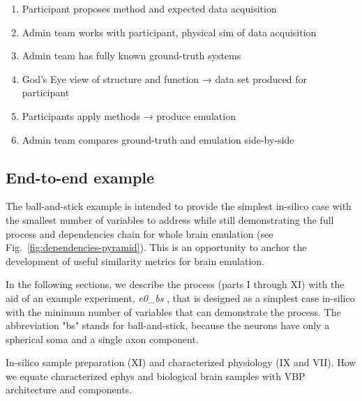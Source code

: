 \documentclass{ldr-article}
\def\firstexp{\textit{e0\_bs} }
\begin{document}
\begin{enumerate}
	\item Participant proposes method and expected data acquisition
	\item Admin team works with participant, physical sim of data acquisition
	\item Admin team has fully known ground-truth systems
	\item God’s Eye view of structure and function → data set produced for participant
	\item Participants apply methods → produce emulation
	\item Admin team compares ground-truth and emulation side-by-side
\end{enumerate}

\subsection{End-to-end example}


The ball-and-stick example is intended to provide the simplest in-silico case with the smallest
number of variables to address while still demonstrating the full process and dependencies
chain for whole brain emulation (see Fig.~\ref{fig:dependencies-pyramid}). This is an opportunity to anchor the development of useful similarity metrics for brain emulation.

In the following sections, we describe the process (parts I through XI) with the aid of an example experiment, \firstexp, that is designed as a simplest case in-silico with the minimum number of variables that can demonstrate the process. The abbreviation "bs" stands for ball-and-stick, because the neurons have only a spherical soma and a single axon component.

In-silico sample preparation (XI) and characterized physiology (IX and VII).
How we equate characterized ephys and biological brain samples with VBP architecture and components.
\end{document}
